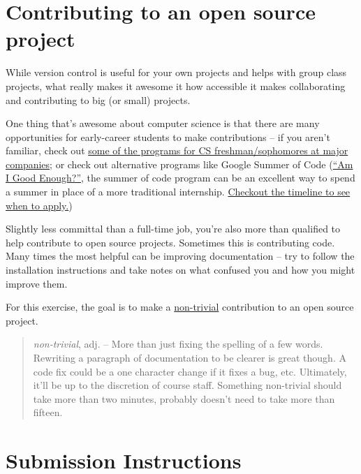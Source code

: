 \documentclass{article}
\begin{document}


\section*{Contributing to an open source project}

While version control is useful for your own projects and helps with group
class projects, what really makes it awesome it how accessible it makes
collaborating and contributing to big (or small) projects.

One thing that's awesome about computer science is that there are many
opportunities for early-career students to make contributions -- if you aren't
familiar, check out
\href{https://www.quora.com/What-companies-have-internship-programs-specifically-for-college-freshmen-and-sophomores}{some
  of the programs for CS freshman/sophomores at major companies}; or check out
alternative programs like Google Summer of Code
(\href{http://write.flossmanuals.net/gsocstudentguide/am-i-good-enough/}
{``Am I Good Enough?''}, the summer of code program can be an excellent way to
spend a summer in place of a more traditional internship.
\href{https://developers.google.com/open-source/gsoc/timeline}
  {Checkout the timeline to see when to apply.})

Slightly less committal than a full-time job, you're also more than qualified
to help contribute to open source projects. Sometimes this is contributing
code. Many times the most helpful can be improving documentation -- try to
follow the installation instructions and take notes on what confused you and
how you might improve them.

For this exercise, the goal is to make a \ul{non-trivial} contribution to an
open source project.

\begin{quote}
  \emph{non-trivial}, adj. -- More than just fixing the spelling of a few words.
    Rewriting a paragraph of documentation to be clearer is great though. A code
    fix could be a one character change if it fixes a bug, etc. Ultimately,
    it'll be up to the discretion of course staff. Something non-trivial should
    take more than two minutes, probably doesn't need to take more than fifteen.
\end{quote}

\section*{Submission Instructions}
\end{document}
